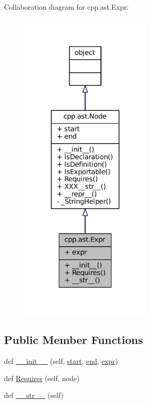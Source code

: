 Collaboration diagram for cpp.\+ast.\+Expr\+:
\nopagebreak
\begin{figure}[H]
\begin{center}
\leavevmode
\includegraphics[width=180pt]{classcpp_1_1ast_1_1Expr__coll__graph}
\end{center}
\end{figure}
\subsection*{Public Member Functions}
\begin{DoxyCompactItemize}
\item 
def \hyperlink{classcpp_1_1ast_1_1Expr_adc83f4b17d6e28a39781678692eb25aa}{\+\_\+\+\_\+init\+\_\+\+\_\+} (self, \hyperlink{classcpp_1_1ast_1_1Node_a7b2aa97e6a049bb1a93aea48c48f1f44}{start}, \hyperlink{classcpp_1_1ast_1_1Node_a3c5e5246ccf619df28eca02e29d69647}{end}, \hyperlink{classcpp_1_1ast_1_1Expr_a2f4e13fb0176f2616f8703103c806462}{expr})
\item 
def \hyperlink{classcpp_1_1ast_1_1Expr_a9c92416eb1285068f190dcda8fd33682}{Requires} (self, node)
\item 
def \hyperlink{classcpp_1_1ast_1_1Expr_a7ee1896fbfa7819adbd0b2f89d11ecec}{\+\_\+\+\_\+str\+\_\+\+\_\+} (self)
\end{DoxyCompactItemize}
